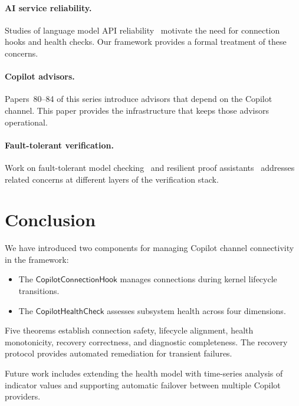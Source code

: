 \documentclass[11pt]{article}
\newcommand{\ConnHook}{\mathsf{CopilotConnectionHook}}
\newcommand{\HealthChk}{\mathsf{CopilotHealthCheck}}
\begin{document}
\paragraph{AI service reliability.}
Studies of language model API
reliability~\cite{chen2023reliability} motivate the
need for connection hooks and health checks.  Our
framework provides a formal treatment of these concerns.

\paragraph{Copilot advisors.}
Papers~80--84 of this series introduce advisors that
depend on the Copilot channel.  This paper provides
the infrastructure that keeps those advisors operational.

\paragraph{Fault-tolerant verification.}
Work on fault-tolerant model
checking~\cite{clarke1999mc} and resilient proof
assistants~\cite{wenzel2014isabelle} addresses related
concerns at different layers of the verification stack.

\section{Conclusion}\label{sec:conclusion}

We have introduced two components for managing Copilot
channel connectivity in the \JuGeo{} framework:
\begin{itemize}
\item The $\ConnHook$ manages connections during kernel
      lifecycle transitions.
\item The $\HealthChk$ assesses subsystem health across
      four dimensions.
\end{itemize}
Five theorems establish connection safety, lifecycle
alignment, health monotonicity, recovery correctness,
and diagnostic completeness.  The recovery protocol
provides automated remediation for transient failures.

Future work includes extending the health model with
time-series analysis of indicator values and supporting
automatic failover between multiple Copilot providers.
\end{document}
